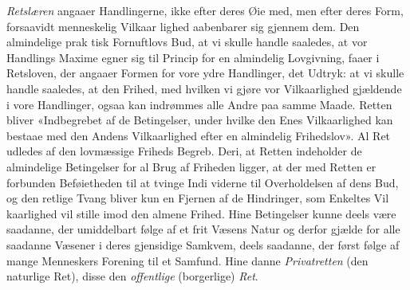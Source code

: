 \documentclass[12pt,a4paper]{book}
\begin{document}
\emph{Retslæren} angaaer Handlingerne, ikke efter deres Øie\-%
med, men efter deres Form, forsaavidt menneskelig Vilkaar\-%
lighed aabenbarer sig gjennem dem. Den almindelige prak\-%
tisk Fornuftlovs Bud, at vi skulle handle saaledes, at vor
Handlings Maxime egner sig til Princip for en almindelig
Lovgivning, faaer i Retsloven, der angaaer Formen for vore
ydre Handlinger, det Udtryk: at vi skulle handle saaledes, at
den Frihed, med hvilken vi gjøre vor Vilkaarlighed gjældende
i vore Handlinger, ogsaa kan indrømmes alle Andre paa samme
Maade. Retten bliver «Indbegrebet af de Betingelser, under
hvilke den Enes Vilkaarlighed kan bestaae med den Andens
Vilkaarlighed efter en almindelig Frihedslov». Al Ret udledes
af den lovmæssige Friheds Begreb. Deri, at Retten indeholder
de almindelige Betingelser for al Brug af Friheden ligger, at
der med Retten er forbunden Beføietheden til at tvinge Indi\-%
viderne til Overholdelsen af dens Bud, og den retlige Tvang
bliver kun en Fjernen af de Hindringer, som Enkeltes Vil\-%
kaarlighed vil stille imod den almene Frihed. Hine Betingelser
kunne deels være saadanne, der umiddelbart følge af et frit
Væsens Natur og derfor gjælde for alle saadanne Væsener i
deres gjensidige Samkvem, deels saadanne, der først følge af
mange Menneskers Forening til et Samfund. Hine danne
\emph{Privatretten} (den naturlige Ret), disse den \emph{offentlige}
(borgerlige) \emph{Ret}.
\end{document}
